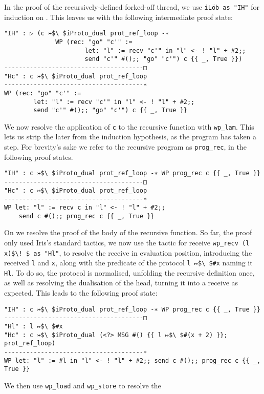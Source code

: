 In the proof of the recursively-defined forked-off thread,
we use \lstinline{iLöb as "IH"} for  induction on .
This leaves us with the following intermediate proof state:
\begin{lstlisting}
"IH" : ▷ (c ↣$\ $iProto_dual prot_ref_loop -∗
              WP (rec: "go" "c'" :=
                      let: "l" := recv "c'" in "l" <- ! "l" + #2;;
                      send "c'" #();; "go" "c'") c {{ _, True }})
--------------------------------------□
"Hc" : c ↣$\ $iProto_dual prot_ref_loop
--------------------------------------∗
WP (rec: "go" "c'" :=
        let: "l" := recv "c'" in "l" <- ! "l" + #2;;
        send "c'" #();; "go" "c'") c {{ _, True }}
\end{lstlisting}
We now resolve the application of \lstinline{c} to the recursive function
with \lstinline{wp_lam}.
This lets us strip the later from the  induction hypothesis, as the program
has taken a step.
For brevity's sake we refer to the recursive program as \lstinline{prog_rec}, in the
following proof states.
\begin{lstlisting}
"IH" : c ↣$\ $iProto_dual prot_ref_loop -∗ WP prog_rec c {{ _, True }}
--------------------------------------□
"Hc" : c ↣$\ $iProto_dual prot_ref_loop
--------------------------------------∗
WP let: "l" := recv c in "l" <- ! "l" + #2;;
    send c #();; prog_rec c {{ _, True }}
\end{lstlisting}
On  we resolve the proof of the body of the recursive function.
So far, the proof only used Iris's standard tactics, we now use the
\lname tactic for receive
\lstinline{wp_recv (l x)$\! $ as "Hl"}, to resolve the
receive in evaluation position, introducing the received \binders
\lstinline{l} and \lstinline{x},
along with the predicate of the protocol \lstinline{l ↦$\ $#x} naming it
\lstinline{Hl}.
To do so, the protocol is normalised, unfolding the recursive definition once,
as well as resolving the dualisation of the head,
turning it into a receive as expected.
This leads to the following proof state:
\begin{lstlisting}
"IH" : c ↣$\ $iProto_dual prot_ref_loop -∗ WP prog_rec c {{ _, True }}
--------------------------------------□
"Hl" : l ↦$\ $#x
"Hc" : c ↣$\ $iProto_dual (<?> MSG #() {{ l ↦$\ $#(x + 2) }}; prot_ref_loop)
--------------------------------------∗
WP let: "l" := #l in "l" <- ! "l" + #2;; send c #();; prog_rec c {{ _, True }}
\end{lstlisting}
We then use \lstinline{wp_load} and \lstinline{wp_store} to resolve the
